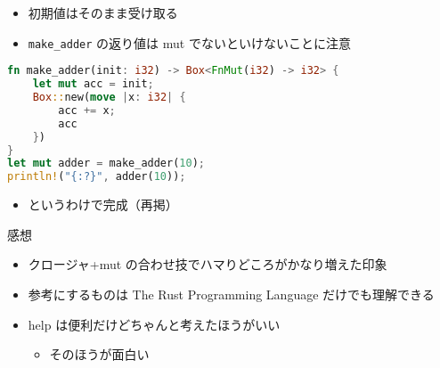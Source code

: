 \documentclass[dvipdfmx,11pt]{beamer}
\begin{document}
\begin{frame}[fragile]
  \begin{itemize}
  \item 初期値はそのまま受け取る
  \item \verb+make_adder+ の返り値は mut でないといけないことに注意
  \end{itemize}
  \begin{lstlisting}[language={Rust}]
fn make_adder(init: i32) -> Box<FnMut(i32) -> i32> {
    let mut acc = init;
    Box::new(move |x: i32| {
        acc += x;
        acc
    })
}
let mut adder = make_adder(10);
println!("{:?}", adder(10));
  \end{lstlisting}  
\end{frame}

\begin{frame}[fragile]
  \begin{itemize}
  \item というわけで完成（再掲）
  \end{itemize}
  
\end{frame}

\begin{frame}[fragile]{感想}
  \begin{itemize}
  \item クロージャ+mut の合わせ技でハマりどころがかなり増えた印象
  \item 参考にするものは The Rust Programming Language だけでも理解できる
  \item help は便利だけどちゃんと考えたほうがいい
    \begin{itemize}
      \item そのほうが面白い
    \end{itemize}
  \end{itemize}
\end{frame}
\end{document}
